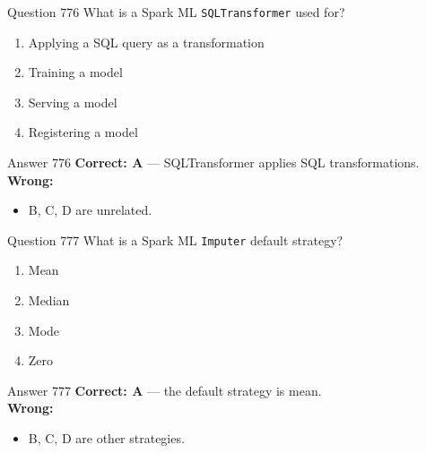 \documentclass[aspectratio=169,11pt]{beamer}
\begin{document}
	\begin{frame}{Question 776}
		What is a Spark ML \texttt{SQLTransformer} used for?
		\begin{enumerate}[label=\Alph*.]
			\item Applying a SQL query as a transformation
			\item Training a model
			\item Serving a model
			\item Registering a model
		\end{enumerate}
	\end{frame}
	\begin{frame}{Answer 776}
		\textbf{Correct: A} --- SQLTransformer applies SQL transformations.\\
		\vspace{0.5em}
		\textbf{Wrong:}
		\begin{itemize}
			\item B, C, D are unrelated.
		\end{itemize}
	\end{frame}
	
	\begin{frame}{Question 777}
		What is a Spark ML \texttt{Imputer} default strategy?
		\begin{enumerate}[label=\Alph*.]
			\item Mean
			\item Median
			\item Mode
			\item Zero
		\end{enumerate}
	\end{frame}
	\begin{frame}{Answer 777}
		\textbf{Correct: A} --- the default strategy is mean.\\
		\vspace{0.5em}
		\textbf{Wrong:}
		\begin{itemize}
			\item B, C, D are other strategies.
		\end{itemize}
	\end{frame}
	
\end{document}

